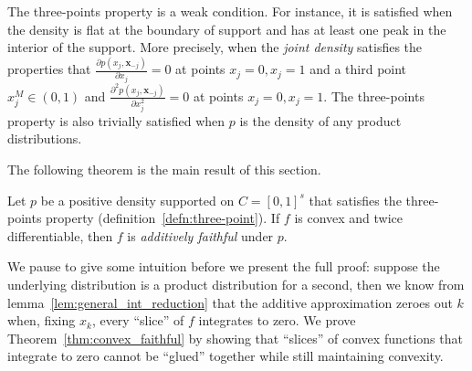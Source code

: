 The three-points property is a weak condition. For instance, it is satisfied when the density is flat at the boundary of support and has at least one peak in the interior of the support. More precisely, when the \emph{joint density} satisfies the properties that $\frac{\partial p(x_j,\mathbf{x}_{-j})}{\partial x_j} = 0$ at points $x_j = 0, x_j= 1$ and a third point $x_j^M \in (0,1)$ and $\frac{\partial^2 p(x_j, \mathbf{x}_{-j})}{\partial x_j^2} = 0$ at points $x_j = 0, x_j=1$. The three-points property is also trivially satisfied when $p$ is the density of any product distributions.

The following theorem is the main result of this section.

\begin{theorem}
\label{thm:convex_faithful}
Let $p$ be a positive density supported on $C=[0,1]^s$ that satisfies the three-points property (definition~\ref{defn:three-point}). If $f$ is convex and twice differentiable, then $f$ is \emph{additively faithful} under $p$.
\end{theorem}


We pause to give some intuition before we present the full proof: 
suppose the underlying distribution is a product distribution for a second, 
then we know from lemma~\ref{lem:general_int_reduction} that the
additive approximation zeroes out $k$ when, fixing $x_k$, every
``slice'' of $f$ integrates to zero. We prove
Theorem~\ref{thm:convex_faithful} by showing that ``slices'' of convex
functions that integrate to zero cannot be ``glued'' together while
still maintaining convexity.


